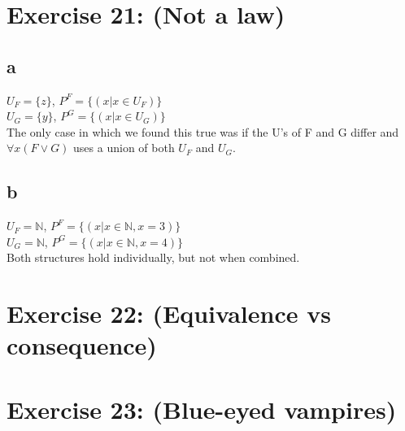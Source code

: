 \documentclass[12pt]{article}
\newcommand{\N}{\mathbb N}
\begin{document}
 

\rhead{\today}


\section*{Exercise 21: (Not a law)}

\subsection*{a}

$U_F = \{z\}$, $P^F=\{(x | x \in U_F)\}$\\
$U_G = \{y\}$, $P^G=\{(x | x \in U_G)\}$\\
The only case in which we found this true was if the U's of F and G differ and $\forall x(F \lor G)$ uses a union of both $U_F$ and $U_G$. 

\subsection*{b}

$U_F = \N$, $P^F=\{(x | x \in \N, x=3)\}$\\
$U_G = \N$, $P^G=\{(x | x \in \N, x=4)\}$\\
Both structures hold individually, but not when combined.

\section*{Exercise 22: (Equivalence vs consequence)}

\section*{Exercise 23: (Blue-eyed vampires)}
\end{document}

